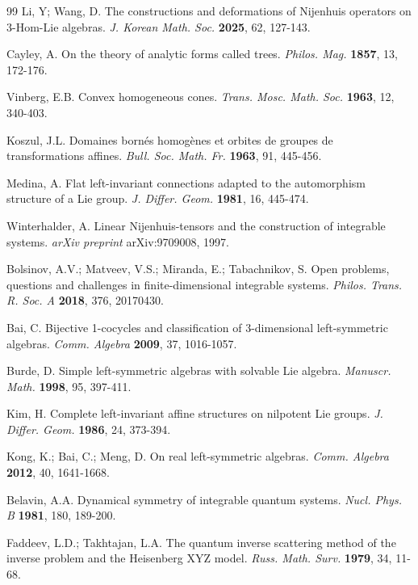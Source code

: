 \documentclass[12pt, reqno]{amsart}
\theoremstyle{plain}
\begin{document}
\begin{thebibliography}{99}
 Li, Y; Wang, D. The constructions and deformations of Nijenhuis operators on 3-Hom-Lie algebras. \emph{J. Korean Math. Soc.} \textbf{2025}, 62, 127-143.



 Cayley, A. On the theory of analytic forms called trees. \emph{Philos. Mag.} \textbf{1857}, 13, 172-176. 

 Vinberg, E.B. Convex homogeneous cones. \emph{Trans. Mosc. Math. Soc.} \textbf{1963}, 12, 340-403.

 Koszul, J.L. Domaines born\'es homog\`enes et orbites de groupes de transformations affines. \emph{Bull. Soc. Math. Fr.} \textbf{1963}, 91, 445-456.  

 Medina, A. Flat left-invariant connections adapted to the automorphism structure of a Lie group. \emph{J. Differ. Geom.} \textbf{1981}, 16, 445-474. 
    
 Winterhalder, A. Linear Nijenhuis-tensors and the construction of integrable systems. \emph{arXiv preprint} arXiv:9709008, 1997.     
    
 Bolsinov, A.V.; Matveev, V.S.; Miranda, E.; Tabachnikov, S. Open problems, questions and challenges in finite-dimensional integrable systems. \emph{Philos. Trans. R. Soc. A} \textbf{2018}, 376, 20170430.   
    
 Bai, C. Bijective 1-cocycles and classification of 3-dimensional left-symmetric algebras. \emph{Comm. Algebra} \textbf{2009}, 37, 1016-1057.     
    
 Burde, D. Simple left-symmetric algebras with solvable Lie algebra. \emph{Manuscr. Math.} \textbf{1998}, 95, 397-411.

 Kim, H. Complete left-invariant affine structures on nilpotent Lie groups. \emph{J. Differ. Geom.} \textbf{1986}, 24, 373-394.

 Kong, K.; Bai, C.; Meng, D. On real left-symmetric algebras. \emph{Comm. Algebra} \textbf{2012}, 40, 1641-1668.
    
 Belavin, A.A. Dynamical symmetry of integrable quantum systems. \emph{Nucl. Phys. B} \textbf{1981}, 180, 189-200.    
        
 Faddeev, L.D.; Takhtajan, L.A. The quantum inverse scattering method of the inverse problem and the Heisenberg XYZ model. \emph{Russ. Math. Surv.} \textbf{1979}, 34, 11-68.


\end{thebibliography}
\end{document}
